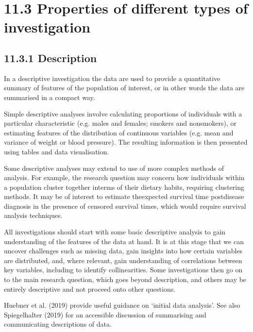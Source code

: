 \documentclass[letterpaper,10pt,english]{jupyterBook}
\begin{document}
\section{11.3 Properties of different types of investigation}
\label{\detokenize{11.d. Types of Investigation:properties-of-different-types-of-investigation}}\label{\detokenize{11.d. Types of Investigation::doc}}

\subsection{11.3.1 Description}
\label{\detokenize{11.d. Types of Investigation:description}}
\sphinxAtStartPar
In a descriptive investigation the data are used to provide a quantitative summary of features of the
population of interest, or in other words the data are summarised in a compact way.

\sphinxAtStartPar
Simple descriptive analyses involve calculating proportions of individuals with a particular characteristic (e.g. males and females; smokers and non\sphinxhyphen{}smokers), or estimating features of the distribution of continuous variables (e.g. mean and variance of weight or blood pressure). The resulting information is then presented using tables and data visualisation.

\sphinxAtStartPar
Some descriptive analyses may extend to use of more complex methods of analysis. For example, the research question may concern how individuals within a population cluster together interms of their dietary habits, requiring clustering methods. It may be of interest to estimate theexpected survival time post\sphinxhyphen{}disease diagnosis in the presence of censored survival times, which
would require survival analysis techniques.

\sphinxAtStartPar
All investigations should start with some basic descriptive analysis to gain understanding of the features of the data at hand. It is at this stage that we can uncover challenges such as missing data, gain insights into how certain variables are distributed, and, where relevant, gain understanding of correlations between key variables, including to identify collinearities. Some investigations then go on to the main research question, which goes beyond description, and others may be entirely descriptive and not proceed onto other questions.

\sphinxAtStartPar
Huebner et al. (2019) provide useful guidance on ‘initial data analysis’. See also Spiegelhalter
(2019) for an accessible discussion of summarising and communicating descriptions of data.
\end{document}
